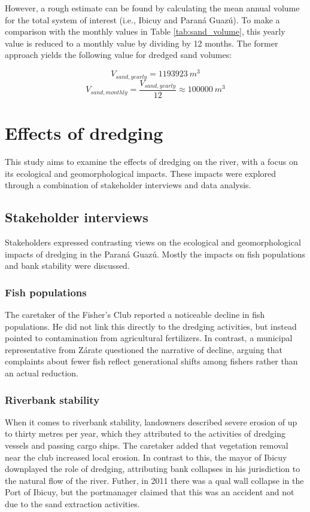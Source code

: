 However, a rough estimate can be found by calculating the mean annual volume for the total system of interest (i.e., Ibicuy and Paraná Guazú). To make a comparison with the monthly values in Table \ref{tab:sand_volume}, this yearly value is reduced to a monthly value by dividing by 12 months. The former approach yields the following value for dredged sand volumes:

\begin{equation}
    V_{sand,yearly} = 1193923 ~m^3
\end{equation}
\begin{equation}
    V_{sand,monthly} = \frac{V_{sand,yearly}}{12} \approx 100000 ~m^3 
\end{equation}

\section{Effects of dredging}
This study aims to examine the effects of dredging on the river, with a focus on its ecological and geomorphological impacts. These impacts were explored through a combination of stakeholder interviews and data analysis.

\subsection{Stakeholder interviews}
Stakeholders expressed contrasting views on the ecological and geomorphological impacts of dredging in the Paraná Guazú. Mostly the impacts on fish populations and bank stability were discussed.

\subsubsection{Fish populations}
The caretaker of the Fisher’s Club reported a noticeable decline in fish populations. He did not link this directly to the dredging activities, but instead pointed to contamination from agricultural fertilizers. In contrast, a municipal representative from Zárate questioned the narrative of decline, arguing that complaints about fewer fish reflect generational shifts among fishers rather than an actual reduction.

\subsubsection{Riverbank stability}
When it comes to riverbank stability, landowners described severe erosion of up to thirty metres per year, which they attributed to the activities of dredging vessels and passing cargo ships. The caretaker added that vegetation removal near the club increased local erosion. In contrast to this, the mayor of Ibicuy downplayed the role of dredging, attributing bank collapses in his jurisdiction to the natural flow of the river. Futher, in 2011 there was a qual wall collapse in the Port of Ibicuy, but the portmanager claimed that this was an accident and not due to the sand extraction activities.

